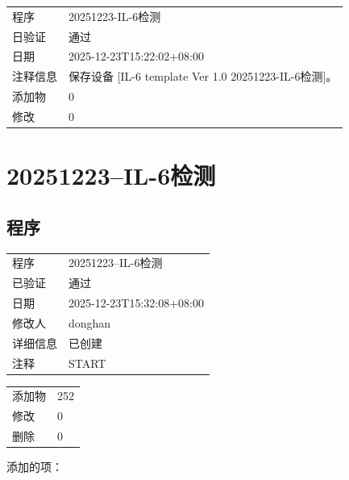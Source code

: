 \documentclass[UTF8,10pt,a4paper,fontset=fandol]{ctexart}
\begin{document}
\vspace{0.8em}

\noindent
\begin{tabular}{@{}p{1.6cm}p{11.5cm}@{}}
程序 & 20251223-IL-6检测\\
日验证 & 通过\\
日期 & 2025-12-23T15:22:02+08:00\\
注释信息 & 保存设备 [IL-6 template Ver 1.0 20251223-IL-6检测]。\\
添加物 & 0\\
修改 & 0
\end{tabular}

\newpage

\section*{20251223--IL-6检测}

\subsection*{程序}

\begin{tabular}{@{}ll@{}}
程序 & 20251223--IL-6检测\\
已验证 & 通过\\
日期 & 2025-12-23T15:32:08+08:00\\
修改人 & donghan\\
详细信息 & 已创建\\
注释 & START\\
\end{tabular}

\medskip
\begin{tabular}{@{}ll@{}}
添加物 & 252\\
修改 & 0\\
删除 & 0\\
\end{tabular}

\medskip
添加的项：
\end{document}

